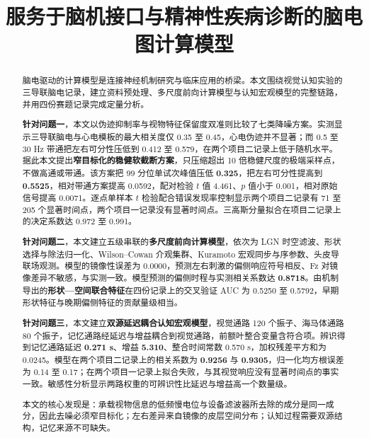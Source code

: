 \documentclass[bwprint]{gmcmthesis}
\title{服务于脑机接口与精神性疾病诊断的脑电图计算模型}
\begin{document}
\label{body:start}

\maketitle

\begin{abstract}\label{abstract:start}
脑电驱动的计算模型是连接神经机制研究与临床应用的桥梁。本文围绕视觉认知实验的三导联脑电记录，建立资料预处理、多尺度前向计算模型与认知宏观模型的完整链路，并用四份赛题记录完成定量分析。

\textbf{针对问题一}，本文以伪迹抑制率与视物特征保留度双准则比较了七类降噪方案。实测显示三导联脑电与心电模板的最大相关度仅 0.35 至 0.45，心电伪迹并不显著；而 0.5 至 30 Hz 带通把左右可分性压低到 0.412 至 0.579，在两个项目二记录上低于随机水平。据此本文提出\textbf{窄目标化的稳健软截断方案}，只压缩超出 10 倍稳健尺度的极端采样点，不做高通或带通。该方案把 99 分位单试次峰值压低 \textbf{0.325}，把左右可分性提高到 \textbf{0.5525}，相对带通方案提高 0.0592，配对检验 $t$ 值 4.461、$p$ 值小于 0.001，相对原始信号提高 0.0071。逐点单样本 $t$ 检验配合错误发现率控制显示两个项目二记录有 71 至 205 个显著时间点，两个项目一记录没有显著时间点。三高斯分量拟合在项目二记录上的决定系数达 0.972 至 0.991。

\textbf{针对问题二}，本文建立五级串联的\textbf{多尺度前向计算模型}，依次为 LGN 时空滤波、形状选择与除法归一化、Wilson--Cowan 介观集群、Kuramoto 宏观同步与序参数、头皮导联场观测。模型的镜像性误差为 0.0000，预测左右刺激的偏侧响应符号相反、Fz 对镜像差异不敏感，与实测一致。模型预测的偏侧时程与实测相关系数达 \textbf{0.8718}。由机制导出的\textbf{形状—空间联合特征}在四份记录上的交叉验证 AUC 为 0.5250 至 0.5792，早期形状特征与晚期偏侧特征的贡献量级相当。

\textbf{针对问题三}，本文建立\textbf{双源延迟耦合认知宏观模型}，视觉通路 120 个振子、海马体通路 80 个振子，记忆通路经延迟与增益耦合到视觉通路，前额叶整合变量含符合项。辨识得到记忆通路延迟 \textbf{0.271 s}、增益 \textbf{5.310}、整合时间常数 0.570 s，加权残差平方和为 0.0245。模型在两个项目二记录上的相关系数为 \textbf{0.9256} 与 \textbf{0.9305}，归一化均方根误差为 0.14 至 0.17；在两个项目一记录上拟合失败，与其视觉响应没有显著时间点的事实一致。敏感性分析显示两路权重的可辨识性比延迟与增益高一个数量级。

本文的核心发现是：承载视物信息的低频慢电位与设备滤波器所去除的成分是同一成分，因此去噪必须窄目标化；左右差异来自镜像的皮层空间分布；认知过程需要双源结构，记忆来源不可缺失。

\label{abstract:end}

\end{abstract}
\end{document}
